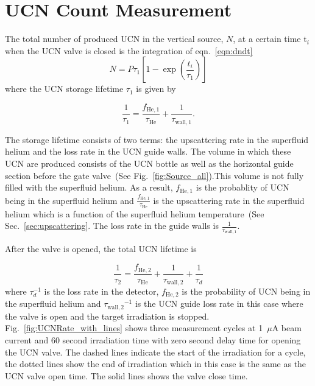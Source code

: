 \section{UCN Count Measurement \label{UCNCounts}}

The total number of produced UCN in the vertical source, $N$, at a
certain time t$_i$ when the UCN valve is closed is the integration of
eqn.~\ref{eqn:dndt}
\begin{equation}
  \label{eq:totalUCN}
  N = P \tau_1\left[ 1- \exp \left(\frac{t_i }{ \tau_1}\right) \right]
\end{equation}
where the UCN storage lifetime $\tau_1$ is given by

\begin{equation}
  \label{eqn:tau1}
  \frac{1}{\tau_1} = \frac{ f_\mathrm{He,1}}{\tau_\mathrm{He}} + \frac{1}{\tau_\mathrm{wall,1}}.
\end{equation}

The storage lifetime consists of two terms: the upscattering rate in
the superfluid helium and the loss rate in the UCN guide walls. The
volume in which these UCN are produced consists of the UCN bottle as
well as the horizontal guide section before the gate valve~(See
Fig.~\ref{fig:Source_all}).This volume is not fully filled with the
superfluid helium. As a result, $ f_\mathrm{He,1}$ is the probablity
of UCN being in the superfluid helium and \large
$\frac{ f_\mathrm{He,1}}{\tau_\mathrm{He}}$ \normalsize is the
upscattering rate in the superfluid helium which is a function of the
superfluid helium temperature~(See Sec.~\ref{sec:upscattering}. The
loss rate in the guide walls is $\frac{1}{\tau_\mathrm{wall,1}}$.

After the valve is opened, the total UCN lifetime is

\begin{equation}
  \label{eqn:tau2}
  \frac{1}{\tau_2} = \frac{ f_\mathrm{He,2}}{\tau_\mathrm{He}} + \frac{1}{\tau_\mathrm{wall,2}}+\frac{1}{\tau_d}
\end{equation}
where $\tau_d^{-1}$ is the loss rate in the detector,
${ f_\mathrm{He,2}}$ is the probability of UCN being in the superfluid
helium and ${\tau_\mathrm{wall,2}}^{-1}$ is the UCN guide loss rate in
this case where the valve is open and the target irradiation is
stopped. Fig.~\ref{fig:UCNRate_with_lines} shows three measurement
cycles at 1~$\mu$A beam current and 60 second irradiation time with
zero second delay time for opening the UCN valve. The dashed lines
indicate the start of the irradiation for a cycle, the dotted lines
show the end of irradiation which in this case is the same as the UCN
valve open time. The solid lines shows the valve close time.



